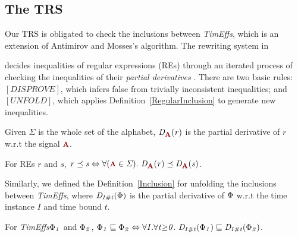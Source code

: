 \documentclass[acmsmall,10pt,review]{acmart}
\newcommand{\timedEffects}{\emph{TimEffs}}
\newcommand{\effect}{\textcolor{black}{\ensuremath{\mathrm{\Phi}}}}
\newcommand{\anyevent}[1]{{\textcolor{darkred}
{{\textbf{\footnotesize #1}}}}}
\newcommand{\code}[1]{{\tt{\ensuremath{\m{#1}}}}}
\newcommand{\CONTAIN}{\sqsubseteq}
\newcommand{\m}{\mathit}
\newcommand\tabref[1]{Table \textcolor{black}{\ref{#1}}.}
\newcommand\defref[1]{Definition~\textcolor{blue}{\ref{#1}}}
\begin{document}
\subsection{The TRS}
Our TRS is obligated to check the inclusions between \timedEffects, which is an extension of Antimirov and Mosses's algorithm. The rewriting system in {\cite{antimirov1995rewriting}  
decides inequalities of regular expressions (REs) through an iterated process of checking the inequalities of their \emph{partial derivatives} \cite{antimirov1995partial}. There are two basic rules: 
\code{[DISPROVE]}, which infers false from trivially inconsistent inequalities; and  
\code{[UNFOLD]}, which applies \defref{RegularInclusion} to generate new inequalities.

Given \code{\Sigma} is the whole set of the alphabet, 
\code{D_{\anyevent{A}}(r)} is the partial derivative of \code{r} w.r.t the signal \code{\anyevent{A}}. 

\begin{definition}\label{RegularInclusion}  For REs \code{r} and \code{s}, \code{r \preceq s \Leftrightarrow \forall (\anyevent{A} \in \Sigma).\ D_{\anyevent{A}}(r) \preceq D_{\anyevent{A}}(s)}.
\end{definition}

Similarly, we defined the \defref{Inclusion} for unfolding the inclusions  between \timedEffects, where \code{D_{I\# t}(\effect)} is the partial derivative of \code{\effect} w.r.t the time instance \code{I} and time bound \code{t}. 

\begin{definition}[\timedEffects Inclusion]\label{Inclusion}  %
For \timedEffects \code{\effect_1 } and \code{\effect_2}, 
\code{\effect_1  \CONTAIN \effect_2 \Leftrightarrow \forall I. \forall t {\geq} 0.\ D_{I\# t}(\effect_1)  \CONTAIN D_{I\# t}(\effect_2)}.
\end{definition}






}
\end{document}
